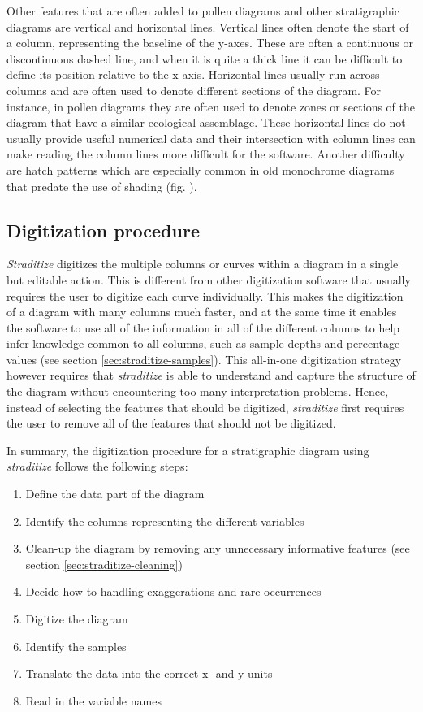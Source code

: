 \begin{refsection}
Other features that are often added to pollen diagrams and other stratigraphic diagrams are vertical and horizontal lines. Vertical lines often denote the start of a column, representing the baseline of the y-axes. These are often a continuous or discontinuous dashed line, and when it is quite a thick line it can be difficult to define its position relative to the x-axis. Horizontal lines usually run across columns and are often used to denote different sections of the diagram. For instance, in pollen diagrams they are often used to denote zones or sections of the diagram that have a similar ecological assemblage. These horizontal lines do not usually provide useful numerical data and their intersection with column lines can make reading the column lines more difficult for the software. Another difficulty are hatch patterns which are especially common in old monochrome diagrams that predate the use of shading (fig. \samplediagram[m]). 


\subsection{Digitization procedure}  \label{sec:straditize-digitization}
\emph{Straditize} digitizes the multiple columns or curves within a diagram in a single but editable action. This is different from other digitization software that usually requires the user to digitize each curve individually. This makes the digitization of a diagram with many columns much faster, and at the same time it enables the software to use all of the information in all of the different columns to help infer knowledge common to all columns, such as sample depths and percentage values (see section \ref{sec:straditize-samples}). This all-in-one digitization strategy however requires that \emph{straditize} is able to understand and capture the structure of the diagram without encountering too many interpretation problems. Hence, instead of selecting the features that should be digitized, \emph{straditize} first requires the user to remove all of the features that should not be digitized.

In summary, the digitization procedure for a stratigraphic diagram using \emph{straditize} follows the following steps:

\begin{enumerate}
	\item Define the data part of the diagram
	\item Identify the columns representing the different variables
	\item Clean-up the diagram by removing any unnecessary informative features (see section \ref{sec:straditize-cleaning}) 
	\item Decide how to handling exaggerations and rare occurrences
	\item Digitize the diagram
	\item Identify the samples
	\item Translate the data into the correct x- and y-units
	\item Read in the variable names
\end{enumerate}


\end{refsection}
